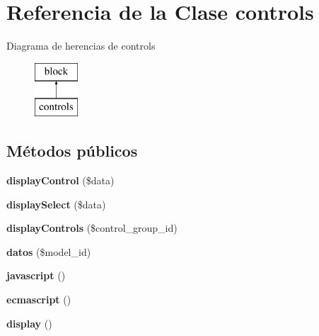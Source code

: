 \hypertarget{classcontrols}{}\section{Referencia de la Clase controls}
\label{classcontrols}
Diagrama de herencias de controls\begin{figure}[H]
\begin{center}
\leavevmode
\includegraphics[height=2.000000cm]{classcontrols}
\end{center}
\end{figure}
\subsection*{Métodos públicos}
\begin{DoxyCompactItemize}
\item 
\mbox{\label{classcontrols_a04cc5e8f1b02044b282605cc3ec3618b}} 
{\bfseries display\+Control} (\$data)
\item 
\mbox{\label{classcontrols_a8f5e4c575408639040ae2ed3b0e5d48d}} 
{\bfseries display\+Select} (\$data)
\item 
\mbox{\label{classcontrols_abeb2846c5ecd32ab5bfcb2769564854d}} 
{\bfseries display\+Controls} (\$control\+\_\+group\+\_\+id)
\item 
\mbox{\label{classcontrols_aa7b6356102da29a6789c8d22b0f41d40}} 
{\bfseries datos} (\$model\+\_\+id)
\item 
\mbox{\label{classcontrols_adcf32ff72657c72dbcb1416b62f2c30b}} 
{\bfseries javascript} ()
\item 
\mbox{\label{classcontrols_a96d2e836bcf5c210d1231f289917f037}} 
{\bfseries ecmascript} ()
\item 
\mbox{\label{classcontrols_a0dc99645804c3ffe83de9d175b5ccfb1}} 
{\bfseries display} ()
\end{DoxyCompactItemize}
